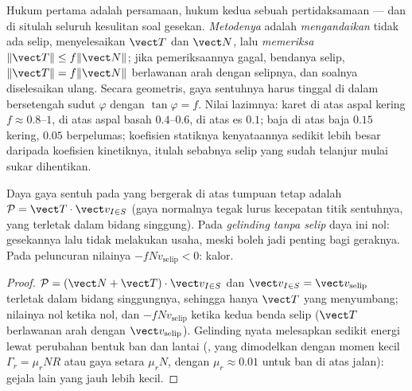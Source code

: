 \begin{remark}\label{rem:b2:rigid-body-mechanics:reading}
Hukum pertama adalah persamaan, hukum kedua sebuah pertidaksamaan ---
dan di situlah seluruh kesulitan soal gesekan. \emph{Metodenya} adalah
\emph{mengandaikan} tidak ada selip, menyelesaikan $\vect T$ dan
$\vect N$, lalu \emph{memeriksa} $\|\vect T\| \le f\|\vect N\|$; jika
pemeriksaannya gagal, bendanya selip, $\|\vect T\| = f\|\vect N\|$
berlawanan arah dengan selipnya, dan soalnya diselesaikan ulang. Secara
geometris, gaya sentuhnya harus tinggal di dalam \emph{}
bersetengah sudut $\varphi$ dengan $\tan\varphi
= f$. Nilai lazimnya: karet di atas aspal kering $f \approx 0.8$--$1$, di
atas aspal basah $0.4$--$0.6$, di atas es $0.1$; baja di atas baja $0.15$
kering, $0.05$ berpelumas; koefisien statiknya kenyataannya sedikit lebih
besar daripada koefisien kinetiknya, itulah sebabnya selip yang sudah
telanjur mulai sukar dihentikan.
\end{remark}

\begin{proposition}\label{prop:b2:rigid-body-mechanics:power}
Daya gaya sentuh pada  yang bergerak di atas tumpuan tetap
adalah $\mathcal P = \vect T\cdot\vect v_{I\in S}$ (gaya normalnya tegak
lurus kecepatan titik sentuhnya, yang terletak dalam bidang singgung).
Pada \emph{gelinding tanpa selip} daya ini nol: gesekannya lalu tidak
melakukan usaha, meski boleh jadi penting bagi geraknya. Pada peluncuran
nilainya $-f N v_{\text{selip}} < 0$: kalor.
\end{proposition}

\begin{proof}
$\mathcal P = (\vect N + \vect T)\cdot\vect v_{I\in S}$ dan $\vect
v_{I\in S} = \vect v_{\text{selip}}$ terletak dalam bidang singgungnya,
sehingga hanya $\vect T$ yang menyumbang; nilainya nol ketika  nol, dan $-fNv_{\text{selip}}$ ketika kedua benda selip ($\vect T$
berlawanan arah dengan $\vect
v_{\text{selip}}$). Gelinding nyata melesapkan sedikit energi lewat
perubahan bentuk ban dan lantai (\emph{}, yang
dimodelkan dengan momen kecil $\Gamma_r = \mu_rNR$ atau gaya setara
$\mu_rN$, dengan $\mu_r \approx 0.01$ untuk ban di atas jalan): gejala
lain yang jauh lebih kecil.
\end{proof}


